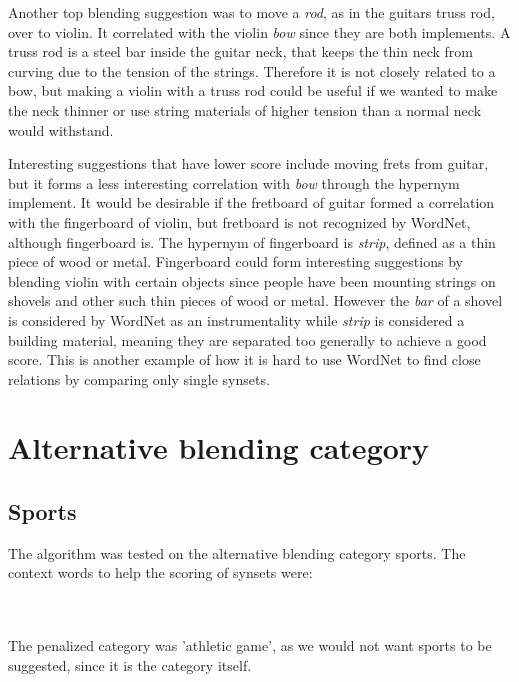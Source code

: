 Another top blending suggestion was to move a \emph{rod}, as in the guitars truss rod, over to violin. It correlated with the violin \emph{bow} since they are both implements. A truss rod is a steel bar inside the guitar neck, that keeps the thin neck from curving due to the tension of the strings. Therefore it is not closely related to a bow, but making a violin with a truss rod could be useful if we wanted to make the neck thinner or use string materials of higher tension than a normal neck would withstand. %

Interesting suggestions that have lower score include moving frets from guitar, but it forms a less interesting correlation with \emph{bow} through the hypernym implement. It would be desirable if the fretboard of guitar formed a correlation with the fingerboard of violin, but fretboard is not recognized by WordNet, although fingerboard is. The hypernym of fingerboard is \emph{strip}, defined as a thin piece of wood or metal. Fingerboard could form interesting suggestions by blending violin with certain objects since people have been mounting strings on shovels and other such thin pieces of wood or metal. However the \emph{bar} of a shovel is considered by WordNet as an instrumentality while \emph{strip} is considered a building material, meaning they are separated too generally to achieve a good score. This is another example of how it is hard to use WordNet to find close relations by comparing only single synsets.


\section{Alternative blending category}
\subsection{Sports}
The algorithm was tested on the alternative blending category sports. The context words to help the scoring of synsets were:

\noindent{}
\\\\The penalized category was 'athletic game', as we would not want sports to be suggested, since it is the category itself.

